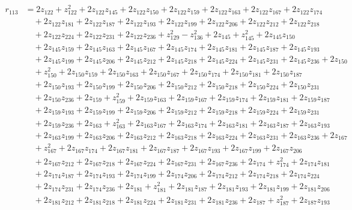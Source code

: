 \begin{align*}
r_{113} &=2z_{122}+z_{122}^{2}+2z_{122}z_{145}+2z_{122}z_{150}+2z_{122}z_{159}+2z_{122}z_{163}+2z_{122}z_{167}+2z_{122}z_{174}\\
&\quad +2z_{122}z_{181}+2z_{122}z_{187}+2z_{122}z_{193}+2z_{122}z_{199}+2z_{122}z_{206}+2z_{122}z_{212}+2z_{122}z_{218}\\
&\quad +2z_{122}z_{224}+2z_{122}z_{231}+2z_{122}z_{236}+z_{129}^{2}-z_{136}^{2}+2z_{145}+z_{145}^{2}+2z_{145}z_{150}\\
&\quad +2z_{145}z_{159}+2z_{145}z_{163}+2z_{145}z_{167}+2z_{145}z_{174}+2z_{145}z_{181}+2z_{145}z_{187}+2z_{145}z_{193}\\
&\quad +2z_{145}z_{199}+2z_{145}z_{206}+2z_{145}z_{212}+2z_{145}z_{218}+2z_{145}z_{224}+2z_{145}z_{231}+2z_{145}z_{236}+2z_{150}\\
&\quad +z_{150}^{2}+2z_{150}z_{159}+2z_{150}z_{163}+2z_{150}z_{167}+2z_{150}z_{174}+2z_{150}z_{181}+2z_{150}z_{187}\\
&\quad +2z_{150}z_{193}+2z_{150}z_{199}+2z_{150}z_{206}+2z_{150}z_{212}+2z_{150}z_{218}+2z_{150}z_{224}+2z_{150}z_{231}\\
&\quad +2z_{150}z_{236}+2z_{159}+z_{159}^{2}+2z_{159}z_{163}+2z_{159}z_{167}+2z_{159}z_{174}+2z_{159}z_{181}+2z_{159}z_{187}\\
&\quad +2z_{159}z_{193}+2z_{159}z_{199}+2z_{159}z_{206}+2z_{159}z_{212}+2z_{159}z_{218}+2z_{159}z_{224}+2z_{159}z_{231}\\
&\quad +2z_{159}z_{236}+2z_{163}+z_{163}^{2}+2z_{163}z_{167}+2z_{163}z_{174}+2z_{163}z_{181}+2z_{163}z_{187}+2z_{163}z_{193}\\
&\quad +2z_{163}z_{199}+2z_{163}z_{206}+2z_{163}z_{212}+2z_{163}z_{218}+2z_{163}z_{224}+2z_{163}z_{231}+2z_{163}z_{236}+2z_{167}\\
&\quad +z_{167}^{2}+2z_{167}z_{174}+2z_{167}z_{181}+2z_{167}z_{187}+2z_{167}z_{193}+2z_{167}z_{199}+2z_{167}z_{206}\\
&\quad +2z_{167}z_{212}+2z_{167}z_{218}+2z_{167}z_{224}+2z_{167}z_{231}+2z_{167}z_{236}+2z_{174}+z_{174}^{2}+2z_{174}z_{181}\\
&\quad +2z_{174}z_{187}+2z_{174}z_{193}+2z_{174}z_{199}+2z_{174}z_{206}+2z_{174}z_{212}+2z_{174}z_{218}+2z_{174}z_{224}\\
&\quad +2z_{174}z_{231}+2z_{174}z_{236}+2z_{181}+z_{181}^{2}+2z_{181}z_{187}+2z_{181}z_{193}+2z_{181}z_{199}+2z_{181}z_{206}\\
&\quad +2z_{181}z_{212}+2z_{181}z_{218}+2z_{181}z_{224}+2z_{181}z_{231}+2z_{181}z_{236}+2z_{187}+z_{187}^{2}+2z_{187}z_{193}\\

\end{align*}
